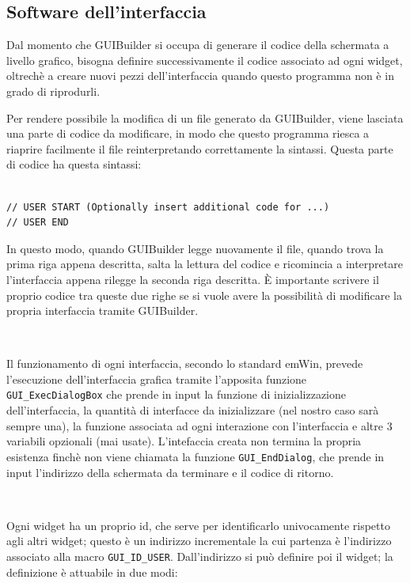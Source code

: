 \documentclass[a4paper,titlepage]{book}
\newcommand{\code}{\lstinline}
\begin{document}
\subsection{Software dell'interfaccia}

Dal momento che GUIBuilder si occupa di generare il codice della schermata a livello grafico, bisogna definire successivamente il codice associato ad ogni widget, oltrechè a creare nuovi pezzi dell'interfaccia quando questo programma non è in grado di riprodurli.

Per rendere possibile la modifica di un file generato da GUIBuilder, viene lasciata una parte di codice da modificare, in modo che questo programma riesca a riaprire facilmente il file reinterpretando correttamente la sintassi. Questa parte di codice ha questa sintassi: 

\begin{lstlisting}

// USER START (Optionally insert additional code for ...)
// USER END

\end{lstlisting}

In questo modo, quando GUIBuilder legge nuovamente il file, quando trova la prima riga appena descritta, salta la lettura del codice e ricomincia a interpretare l'interfaccia appena rilegge la seconda riga descritta. È importante scrivere il proprio codice tra queste due righe se si vuole avere la possibilità di modificare la propria interfaccia tramite GUIBuilder.

~

Il funzionamento di ogni interfaccia, secondo lo standard emWin, prevede l'esecuzione dell'interfaccia grafica tramite l'apposita funzione \code!GUI_ExecDialogBox! che prende in input la funzione di inizializzazione dell'interfaccia, la quantità di interfacce da inizializzare (nel nostro caso sarà sempre una), la funzione associata ad ogni interazione con l'interfaccia e altre 3 variabili opzionali (mai usate). L'intefaccia creata non termina la propria esistenza finchè non viene chiamata la funzione \code!GUI_EndDialog!, che prende in input l'indirizzo della schermata da terminare e il codice di ritorno.

~

Ogni widget ha un proprio id, che serve per identificarlo univocamente rispetto agli altri widget; questo è un indirizzo incrementale la cui partenza è l'indirizzo associato alla macro \code!GUI_ID_USER!. Dall'indirizzo si può definire poi il widget; la definizione è attuabile in due modi:
\end{document}
